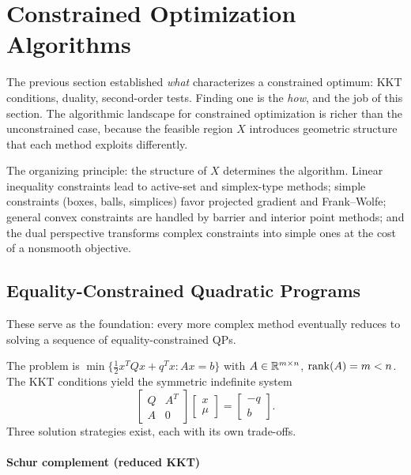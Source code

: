 \section{Constrained Optimization Algorithms}\label{sec:constrained-algorithms}

The previous section established \emph{what} characterizes a constrained optimum: KKT conditions, duality, second-order tests.
Finding one is the \emph{how}, and the job of this section.
The algorithmic landscape for constrained optimization is richer than the unconstrained case, because the feasible region $X$ introduces geometric structure that each method exploits differently.

The organizing principle: the structure of $X$ determines the algorithm.
Linear inequality constraints lead to active-set and simplex-type methods; simple constraints (boxes, balls, simplices) favor projected gradient and Frank--Wolfe; general convex constraints are handled by barrier and interior point methods; and the dual perspective transforms complex constraints into simple ones at the cost of a nonsmooth objective.


\subsection{Equality-Constrained Quadratic Programs}\label{sec:eq-constrained-qp}

These serve as the foundation: every more complex method eventually reduces to solving a sequence of equality-constrained QPs.

The problem is $\min\{\frac{1}{2} x^T Q x + q^T x : Ax = b\}$ with $A \in \mathbb{R}^{m \times n}$, $\operatorname{rank}(A) = m < n$.
The KKT conditions yield the symmetric indefinite system
\begin{equation}\label{eq:kkt-system}
	\begin{bmatrix} Q & A^T \\ A & 0 \end{bmatrix}
	\begin{bmatrix} x \\ \mu \end{bmatrix}
	= \begin{bmatrix} -q \\ b \end{bmatrix}.
\end{equation}
Three solution strategies exist, each with its own trade-offs.

\paragraph{Schur complement (reduced KKT)}

